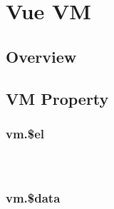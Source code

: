 \part{Vue VM}


\chapter{Overview}





\chapter{VM Property}


\section{vm.\$el}








\begin{lstlisting}[language=JavaScript]

\end{lstlisting}




\begin{lstlisting}[language=JavaScript]

\end{lstlisting}




\begin{lstlisting}[language=JavaScript]

\end{lstlisting}






\section{vm.\$data}






\begin{lstlisting}[language=JavaScript]

\end{lstlisting}




\begin{lstlisting}[language=JavaScript]

\end{lstlisting}




